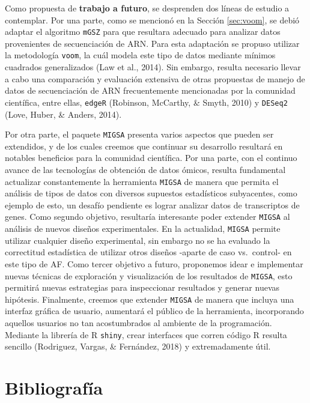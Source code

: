 \documentclass[12pt,twoside]{reedthesis}
\begin{document}
\par

Como propuesta de \textbf{trabajo a futuro}, se desprenden dos líneas de estudio a contemplar. Por una parte, como se mencionó en la Sección \ref{sec:voom}, se debió adaptar el algoritmo \texttt{mGSZ} para que resultara adecuado para analizar datos provenientes de secuenciación de ARN. Para esta adaptación se propuso utilizar la metodología \texttt{voom}, la cuál modela este tipo de datos mediante mínimos cuadrados generalizados (Law et al., 2014). Sin embargo, resulta necesario llevar a cabo una comparación y evaluación extensiva de otras propuestas de manejo de datos de secuenciación de ARN frecuentemente mencionadas por la comunidad científica, entre ellas, \texttt{edgeR} (Robinson, McCarthy, \& Smyth, 2010) y \texttt{DESeq2} (Love, Huber, \& Anders, 2014).

\par

Por otra parte, el paquete \texttt{MIGSA} presenta varios aspectos que pueden ser extendidos, y de los cuales creemos que continuar su desarrollo resultará en notables beneficios para la comunidad científica. Por una parte, con el continuo avance de las tecnologías de obtención de datos ómicos, resulta fundamental actualizar constantemente la herramienta \texttt{MIGSA} de manera que permita el análisis de tipos de datos con diversos supuestos estadísticos subyacentes, como ejemplo de esto, un desafío pendiente es lograr analizar datos de transcriptos de genes. Como segundo objetivo, resultaría interesante poder extender \texttt{MIGSA} al análisis de nuevos diseños experimentales. En la actualidad, \texttt{MIGSA} permite utilizar cualquier diseño experimental, sin embargo no se ha evaluado la correctitud estadística de utilizar otros diseños -aparte de caso vs.~control- en este tipo de AF. Como tercer objetivo a futuro, proponemos idear e implementar nuevas técnicas de exploración y visualización de los resultados de \texttt{MIGSA}, esto permitirá nuevas estrategias para inspeccionar resultados y generar nuevas hipótesis. Finalmente, creemos que extender \texttt{MIGSA} de manera que incluya una interfaz gráfica de usuario, aumentará el público de la herramienta, incorporando aquellos usuarios no tan acostumbrados al ambiente de la programación. Mediante la librería de R \texttt{shiny}, crear interfaces que corren código R resulta sencillo (Rodriguez, Vargas, \& Fernández, 2018) y extremadamente útil.

\hypertarget{bibliografia}{%
\chapter*{Bibliografía}\label{bibliografia}}
\end{document}
